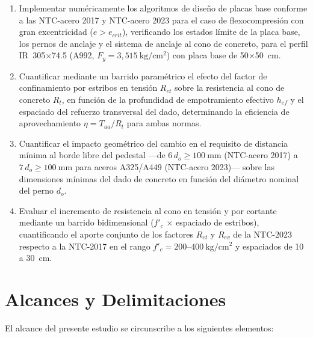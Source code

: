 \begin{enumerate}
  \item Implementar numéricamente los algoritmos de diseño de placas base conforme a las
    NTC-acero 2017 y NTC-acero 2023 para el caso de flexocompresión con gran excentricidad
    ($e > e_{crit}$), verificando los estados límite de la placa base, los pernos de anclaje y
    el sistema de anclaje al cono de concreto, para el perfil IR~305$\times$74.5 (A992,
    $F_y = 3{,}515\ \mathrm{kg/cm^2}$) con placa base de 50$\times$50~cm.

  \item Cuantificar mediante un barrido paramétrico el efecto del factor de confinamiento por
    estribos en tensión $R_{et}$ sobre la resistencia al cono de concreto $R_t$, en función de
    la profundidad de empotramiento efectivo $h_{ef}$ y el espaciado del refuerzo transversal del
    dado, determinando la eficiencia de aprovechamiento $\eta = T_{ua}/R_t$ para ambas normas.

  \item Cuantificar el impacto geométrico del cambio en el requisito de distancia mínima al borde
    libre del pedestal ---de $6\,d_o \geq 100\ \mathrm{mm}$ (NTC-acero 2017) a
    $7\,d_o \geq 100\ \mathrm{mm}$ para aceros A325/A449 (NTC-acero 2023)--- sobre las dimensiones
    mínimas del dado de concreto en función del diámetro nominal del perno $d_o$.

  \item Evaluar el incremento de resistencia al cono en tensión y por cortante mediante un
    barrido bidimensional ($f'_c$ $\times$ espaciado de estribos), cuantificando el aporte
    conjunto de los factores $R_{et}$ y $R_{ev}$ de la NTC-2023 respecto a la NTC-2017 en el
    rango $f'_c = 200$--$400\ \mathrm{kg/cm^2}$ y espaciados de 10 a 30~cm.
\end{enumerate}

\section{Alcances y Delimitaciones}

El alcance del presente estudio se circunscribe a los siguientes elementos:

